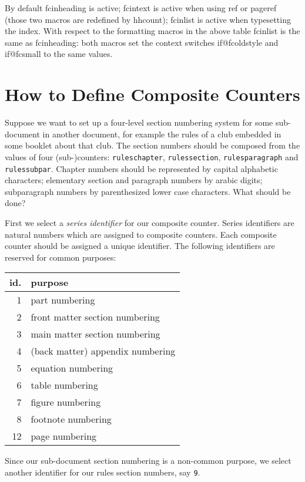 \documentclass[11pt]{article}
\makeatletter
\def\packagename#1{{\sffamily #1}}     %
\def\macroname#1{{\ttfamily\@ttbs#1}}  %
\def\hhcount{\packagename{hhcount}\xspace}
\def\<#1>{\macroname{#1}}
\makeatother
\begin{document}
By default \<fcinheading> is active; \<fcintext> is active when using
\<ref> or \<pageref> (those two macros are redefined by \hhcount);
\<fcinlist> is active when typesetting the index. With respect to the
formatting macros in the above table \<fcinlist> is the same as \<fcinheading>:
both macros set the context switches \<if@fcoldstyle> and \<if@fcsmall>
to the same values.

\section{How to Define Composite Counters}

Suppose we want to set up a four-level section numbering system for
some sub-document in another document, for example the rules of a club
embedded in some booklet about that club.
The section numbers should be composed from the values of four
\hbox{(sub-)}counters: {\tt ruleschapter},
{\tt rulessection}, {\tt rulesparagraph} and {\tt rulessubpar}. Chapter numbers
should be represented by capital alphabetic characters;
elementary section and paragraph numbers by arabic digits;
subparagraph numbers by parenthesized lower case characters.
What should be done?

First we select a {\it series identifier} for our composite counter.
Series identifiers are natural numbers which are assigned to
composite counters. Each composite counter should be assigned a unique
identifier. The following identifiers are reserved for common purposes:

\begin{tabular}{|r|l|}\hline
  id. & purpose \\\hline
   1  & part numbering \\
   2  & front matter section numbering \\
   3  & main matter section numbering \\
   4  & (back matter) appendix numbering \\
   5  & equation numbering \\
   6  & table numbering \\
   7  & figure numbering \\
   8  & footnote numbering \\
  12  & page numbering \\\hline
\end{tabular}

Since our sub-document section numbering is a non-common purpose, we
select another identifier for our rules section numbers, say {\tt 9}.
\end{document}
